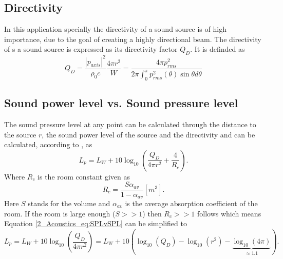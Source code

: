 \subsection{Directivity}
In this application specially the directivity of a sound source is of high importance, due to the goal of creating a highly directional beam. 
The directivity of s a sound source is expressed as its directivity factor $Q_D$. It is definded as \cite{DirectivityIndices}
\begin{equation}\label{2_Acoustics_eq:Directivity}
    Q_D = \frac{|p_{axis}|^2}{\rho_0 c}\frac{4 \pi r^2}{W} = \frac{4 \pi p_{rms}^2}{2\pi\int_0^{\pi}p^2_{rms}(\theta)\sin{\theta}d\theta} 
\end{equation}
\subsection{Sound power level vs. Sound pressure level}
The sound pressure level at any point can be calculated through the distance to the source $r$, the sound power level of the source and the directivity and can be calculated, according to \cite{Relationship_Sound_pressure}, as
\begin{equation}\label{2_Acoustics_eq:SPLvSPL}
    L_p = L_W + 10\log_{10}\left( \frac{Q_D}{4 \pi r^2} + \frac{4}{R_c} \right ).
\end{equation}
Where $R_c$ is the room constant given as
\begin{equation}
    R_c = \frac{S\alpha_{av}}{1 - \alpha_{av}} [m^3].
\end{equation}
Here $S$ stands for the volume  and $\alpha_{av}$ is the average absorption coefficient of the room.  If the room is large enough ($S >> 1$) then $R_c >> 1$ follows which means Equation \ref{2_Acoustics_eq:SPLvSPL} can be simplified to
\begin{equation}
     L_p 
     = 
     L_W + 10\log_{10}\left( \frac{Q_D}{4 \pi r^2} \right ) 
     =
     L_W + 10\left ( \log_{10}(Q_D) - \log_{10}(r^2) - \underbrace{\log_{10}(4\pi)}_{\approx 1.1}  \right ). 
\end{equation}